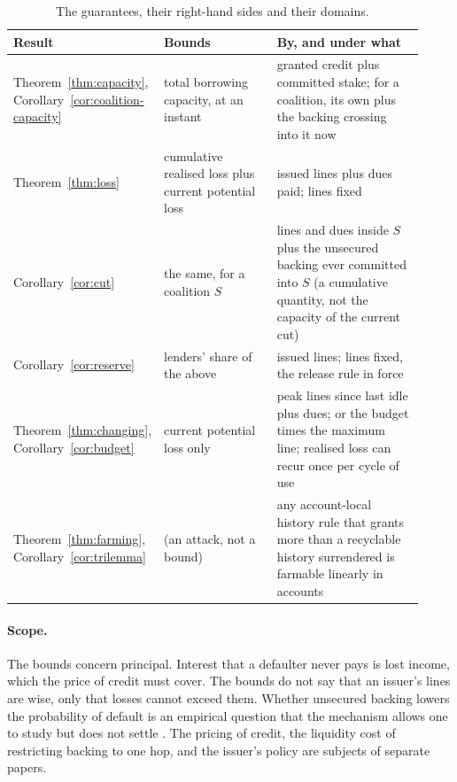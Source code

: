 \documentclass[acmsmall,nonacm,screen]{acmart}
\theoremstyle{acmdefinition}%
\begin{document}
\begin{table}[t]
  \caption{The guarantees, their right-hand sides and their domains.}
  \label{tab:guarantees}
  \centering\small
  \begin{tabular}{p{0.22\linewidth}p{0.3\linewidth}p{0.4\linewidth}}
    \toprule
    Result & Bounds & By, and under what \\
    \midrule
    Theorem~\ref{thm:capacity}, Corollary~\ref{cor:coalition-capacity} & total borrowing capacity, at an instant & granted credit plus committed stake; for a coalition, its own plus the backing crossing into it now \\
    Theorem~\ref{thm:loss} & cumulative realised loss plus current potential loss & issued lines plus dues paid; lines fixed \\
    Corollary~\ref{cor:cut} & the same, for a coalition $S$ & lines and dues inside $S$ plus the unsecured backing ever committed into $S$ (a cumulative quantity, not the capacity of the current cut) \\
    Corollary~\ref{cor:reserve} & lenders' share of the above & issued lines; lines fixed, the release rule in force \\
    Theorem~\ref{thm:changing}, Corollary~\ref{cor:budget} & current potential loss only & peak lines since last idle plus dues; or the budget times the maximum line; realised loss can recur once per cycle of use \\
    Theorem~\ref{thm:farming}, Corollary~\ref{cor:trilemma} & (an attack, not a bound) & any account-local history rule that grants more than a recyclable history surrendered is farmable linearly in accounts \\
    \bottomrule
  \end{tabular}
\end{table}

\paragraph{Scope.} The bounds concern principal. Interest that a defaulter never pays is lost
income, which the price of credit must cover. The bounds do not say that an issuer's lines are wise,
only that losses cannot exceed them. Whether unsecured backing lowers the probability of default
is an empirical question that the mechanism allows one to study but does not settle
\citep{gine2014group}. The pricing of credit, the liquidity cost of restricting backing to one hop,
and the issuer's policy are subjects of separate papers.
\end{document}
